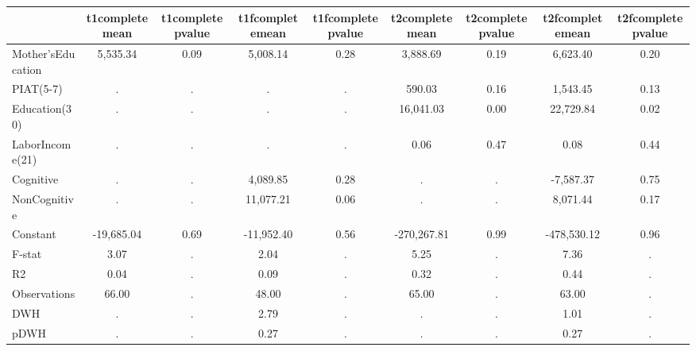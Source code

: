 \begin{table}[htbp]
\begin{tabular}{lcccccccc} \hline \hline
 & t1completemean  & t1completepvalue  & t1fcompletemean  & t1fcompletepvalue  & t2completemean  & t2completepvalue  & t2fcompletemean  & t2fcompletepvalue  \\  \hline 
Mother'sEducation &     5,535.34 &         0.09 &     5,008.14 &         0.28 &     3,888.69 &         0.19 &     6,623.40 &         0.20 \\  
PIAT(5-7) &            . &            . &            . &            . &       590.03 &         0.16 &     1,543.45 &         0.13 \\  
Education(30) &            . &            . &            . &            . &    16,041.03 &         0.00 &    22,729.84 &         0.02 \\  
LaborIncome(21) &            . &            . &            . &            . &         0.06 &         0.47 &         0.08 &         0.44 \\  
Cognitive &            . &            . &     4,089.85 &         0.28 &            . &            . &    -7,587.37 &         0.75 \\  
NonCognitive &            . &            . &    11,077.21 &         0.06 &            . &            . &     8,071.44 &         0.17 \\  
Constant &   -19,685.04 &         0.69 &   -11,952.40 &         0.56 &  -270,267.81 &         0.99 &  -478,530.12 &         0.96 \\  
F-stat &         3.07 &            . &         2.04 &            . &         5.25 &            . &         7.36 &            . \\  
R2 &         0.04 &            . &         0.09 &            . &         0.32 &            . &         0.44 &            . \\  
Observations &        66.00 &            . &        48.00 &            . &        65.00 &            . &        63.00 &            . \\  
DWH &            . &            . &         2.79 &            . &            . &            . &         1.01 &            . \\  
pDWH &            . &            . &         0.27 &            . &            . &            . &         0.27 &            . \\  
\hline \hline \end{tabular}
\end{table}

